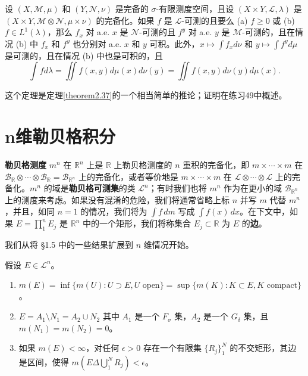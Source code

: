 \documentclass[lang=cn,10pt,thmcnt=section]{elegantbook}
\begin{document}
\begin{theorem}\label{theorem2.39}
设 $(X, \mathcal{M}, \mu)$ 和 $(Y, \mathcal{N}, \nu)$ 是完备的 $\sigma$-有限测度空间，且设 $(X \times Y, \mathcal{L}, \lambda)$ 是 $(X \times Y, \mathcal{M} \otimes \mathcal{N}, \mu \times \nu)$ 的完备化。如果 $f$ 是 $\mathcal{L}$-可测的且要么 (a) $f \geq 0$ 或 (b) $f \in L^1(\lambda)$，那么 $f_x$ 对 a.e. $x$ 是 $\mathcal{N}$-可测的且 $f^y$ 对 a.e. $y$ 是 $\mathcal{M}$-可测的，且在情况 (b) 中 $f_x$ 和 $f^y$ 也分别对 a.e. $x$ 和 $y$ 可积。此外，$x \mapsto \int f_x d\nu$ 和 $y \mapsto \int f^y d\mu$ 是可测的，且在情况 (b) 中也是可积的，且
\[ \int f d\lambda = \iint f(x, y) d\mu(x) d\nu(y) = \iint f(x, y) d\nu(y) d\mu(x). \]
\end{theorem}

这个定理是定理\ref{theorem2.37}的一个相当简单的推论；证明在练习49中概述。

\section{n维勒贝格积分}

\textbf{勒贝格测度} $m^n$ 在 $\mathbb{R}^n$ 上是 $\mathbb{R}$ 上勒贝格测度的 $n$ 重积的完备化，即 $m \times \cdots \times m$ 在 $\mathcal{B}_{\mathbb{R}} \otimes \cdots \otimes \mathcal{B}_{\mathbb{R}} = \mathcal{B}_{\mathbb{R}^n}$ 上的完备化，或者等价地是 $m \times \cdots \times m$ 在 $\mathcal{L} \otimes \cdots \otimes \mathcal{L}$ 上的完备化。$m^n$ 的域是\textbf{勒贝格可测集}的类 $\mathcal{L}^n$；有时我们也将 $m^n$ 作为在更小的域 $\mathcal{B}_{\mathbb{R}^n}$ 上的测度来考虑。如果没有混淆的危险，我们将通常省略上标 $n$ 并写 $m$ 代替 $m^n$，并且，如同 $n=1$ 的情况，我们将为 $\int f \,dm$ 写成 $\int f(x) \,dx$。在下文中，如果 $E = \prod_1^n E_j$ 是 $\mathbb{R}^n$ 中的一个矩形，我们将称集合 $E_j \subset \mathbb{R}$ 为 $E$ 的\textbf{边}。

我们从将 §1.5 中的一些结果扩展到 $n$ 维情况开始。

\begin{theorem}\label{theorem2.40}
假设 $E \in \mathcal{L}^n$。
\begin{enumerate}[label=\alph*.]
\item $m(E) = \inf\{m(U) : U \supset E, U \text{ open}\} = \sup\{m(K) : K \subset E, K \text{ compact}\}$。
\item $E = A_1 \setminus N_1 = A_2 \cup N_2$ 其中 $A_1$ 是一个 $F_\sigma$ 集，$A_2$ 是一个 $G_\delta$ 集，且 $m(N_1)=m(N_2)=0$。
\item 如果 $m(E) < \infty$，对任何 $\epsilon > 0$ 存在一个有限集 $\{R_j\}_1^N$ 的不交矩形，其边是区间，使得 $m(E \Delta \bigcup_1^N R_j) < \epsilon$。
\end{enumerate}
\end{theorem}
\end{document}
